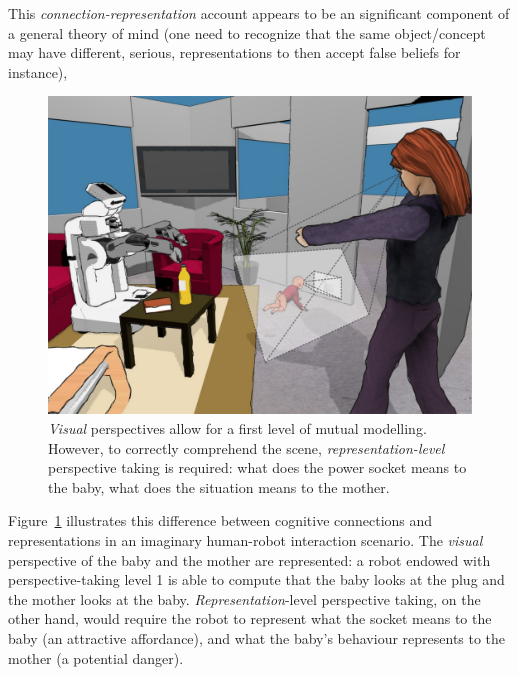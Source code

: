 \documentclass{sig-alternate}
\begin{document}
This \emph{connection-representation} account appears to be an significant
component of a general theory of mind (one need to recognize that the same
object/concept may have different, serious, representations to then accept false
beliefs for instance),


\begin{figure}
        \centering
        \includegraphics[width=0.9\columnwidth]{representation-perspective-taking}
        \caption{\small \emph{Visual} perspectives allow for a first level of mutual
            modelling. However, to correctly comprehend the scene,
            \emph{representation-level} perspective taking is required: what
            does the power socket means to the baby, what does the situation
            means to the mother.}

        \label{representation-level}
\end{figure}

Figure~\ref{representation-level} illustrates this difference between cognitive
connections and representations in an imaginary human-robot interaction
scenario. The \emph{visual} perspective of the baby and the mother are
represented: a robot endowed with perspective-taking level 1 is able to compute
that the baby looks at the plug and the mother looks at the baby.
\emph{Representation}-level perspective taking, on the other hand, would require
the robot to represent what the socket means to the baby (an attractive
affordance), and what the baby's behaviour represents to the mother (a potential
danger).
\end{document}
